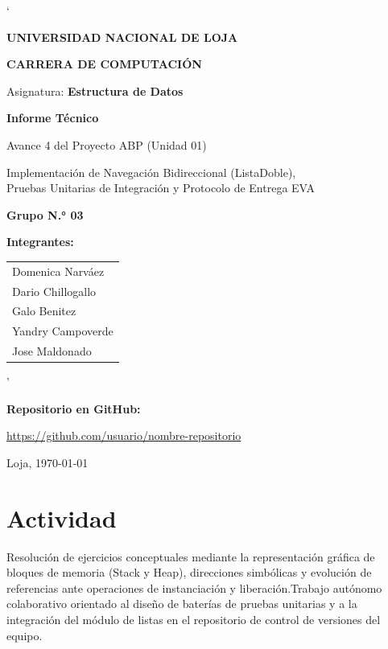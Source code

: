 \documentclass[a4paper,11pt]{article} %
\begin{document}
\begin{titlepage}
`   \centering
   {\large \textbf{UNIVERSIDAD NACIONAL DE LOJA}\par}
   \vspace{0.4cm}
   {\large \textbf{CARRERA DE COMPUTACIÓN}\par}
   \vspace{2cm}
   {\large Asignatura: \textbf{Estructura de Datos}\par}
   \vspace{2cm}
   {\Large \textbf{Informe Técnico}\par}
   \vspace{0.3cm}
   {\large Avance 4 del Proyecto ABP (Unidad 01)\par}
   \vspace{0.3cm}
   {\large Implementación de Navegación Bidireccional (ListaDoble),\\
   Pruebas Unitarias de Integración y Protocolo de Entrega EVA\par}
   \vspace{2cm}
   {\large \textbf{Grupo N.° 03}\par}
   \vspace{1cm}
   {\large \textbf{Integrantes:}\par}
   \vspace{0.3cm}
   \begin{tabular}{l}
      Domenica Narváez \\
      Dario Chillogallo \\
      Galo Benitez \\
      Yandry Campoverde \\
      Jose Maldonado \\
   \end{tabular}'

   \vspace{1cm}
   {\large \textbf{Repositorio en GitHub:}\par}
   \vspace{0.3cm}
   {\large \url{https://github.com/usuario/nombre-repositorio}\par}

   \vfill
   {\large Loja, \today\par}
\end{titlepage}


\section*{Actividad}
Resolución de ejercicios conceptuales mediante la representación gráfica de bloques de memoria (Stack y Heap), direcciones simbólicas y evolución de referencias ante operaciones de instanciación y liberación.Trabajo autónomo colaborativo orientado al diseño de baterías de pruebas unitarias y a la integración del módulo de listas en el repositorio de control de versiones del equipo.
\end{document}

